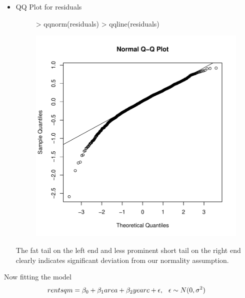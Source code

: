 \documentclass[12pt]{article}
\begin{document}
\begin{itemize}
\item QQ Plot for residuals
\begin{figure}[H]
\begin{Schunk}
\begin{Sinput}
> qqnorm(residuals)
> qqline(residuals)
\end{Sinput}
\end{Schunk}
\includegraphics{HW3-042}
\end{figure}
The fat tail on the left end and less prominent short tail on the right end clearly indicates significant deviation from our normality assumption.
\end{itemize}


\item  Now fitting the model 
\begin{equation*}
\begin{aligned}
rentsqm &= \beta_0 + \beta_1 area + \beta_2 yearc + \epsilon, \hspace{0.1in} \epsilon \sim N(0,\sigma^2)
\end{aligned}
\end{equation*}
\end{document}
